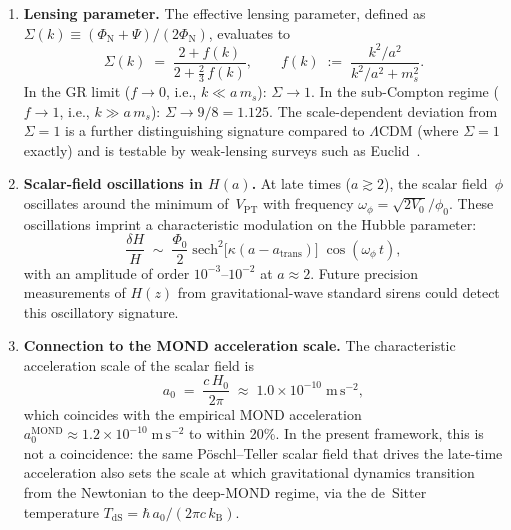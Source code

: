\documentclass[12pt,a4paper]{article}
\theoremstyle{definition}
\theoremstyle{plain}
\theoremstyle{remark}
\begin{document}
\begin{enumerate}
  \item \textbf{Lensing parameter.}\;
        The effective lensing parameter, defined as
        $\Sigma(k) \equiv (\Phi_{\mathrm{N}} + \Psi)/
        (2\Phi_{\mathrm{N}})$, evaluates to
        \begin{equation}\label{eq:Sigma}
          \Sigma(k) \;=\;
          \frac{2 + f(k)}{2 + \tfrac{2}{3}\,f(k)},
          \qquad
          f(k) \;:=\;
          \frac{k^{2}/a^{2}}{k^{2}/a^{2} + m_{s}^{2}}.
        \end{equation}
        In the GR limit ($f \to 0$, i.e., $k \ll a\,m_s$):
        $\Sigma \to 1$.  In the sub-Compton regime ($f \to 1$, i.e.,
        $k \gg a\,m_s$): $\Sigma \to 9/8 = 1.125$.  The
        scale-dependent deviation from $\Sigma = 1$ is a further
        distinguishing signature compared to $\Lambda$CDM (where
        $\Sigma = 1$ exactly) and is testable by weak-lensing surveys
        such as Euclid~\cite{SotiriouFaraoni2010}.

  \item \textbf{Scalar-field oscillations in $H(a)$.}\;
        At late times ($a \gtrsim 2$), the scalar field~$\phi$
        oscillates around the minimum of~$V_{\mathrm{PT}}$ with
        frequency $\omega_{\phi} = \sqrt{2V_{0}}/\phi_{0}$. These
        oscillations imprint a characteristic modulation on the Hubble
        parameter:
        \begin{equation}
          \frac{\delta H}{H}
          \;\sim\; \frac{\Phi_{0}}{2}\;
          \mathrm{sech}^{2}\!\bigl[\kappa(a - a_{\mathrm{trans}})\bigr]\;
          \cos(\omega_{\phi}\,t),
        \end{equation}
        with an amplitude of order $10^{-3}$--$10^{-2}$ at $a \approx 2$.
        Future precision measurements of $H(z)$ from gravitational-wave
        standard sirens could detect this oscillatory signature.

  \item \textbf{Connection to the MOND acceleration scale.}\;
        The characteristic acceleration scale of the scalar field is
        \begin{equation}\label{eq:a0-MOND}
          a_{0} \;=\; \frac{c\,H_{0}}{2\pi}
          \;\approx\; 1.0 \times 10^{-10}\;\mathrm{m\,s^{-2}},
        \end{equation}
        which coincides with the empirical MOND
        acceleration~$a_{0}^{\mathrm{MOND}} \approx 1.2 \times
        10^{-10}\;\mathrm{m\,s^{-2}}$ to within 20\%. In the
        present framework, this is not a coincidence: the same
        P\"oschl--Teller scalar field that drives the late-time
        acceleration also sets the scale at which gravitational
        dynamics transition from the Newtonian to the deep-MOND
        regime, via the de~Sitter temperature
        $T_{\mathrm{dS}} = \hbar\,a_{0}/(2\pi c\,k_{\mathrm{B}})$.


\end{enumerate}
\end{document}

